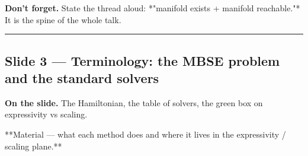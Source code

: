 \documentclass[11pt]{article}
\begin{document}
\textbf{Don't forget.} State the thread aloud: *"manifold exists + manifold
reachable."* It is the spine of the whole talk.

\vspace{4pt}\hrule\vspace{8pt}

\subsection*{Slide 3 --- Terminology: the MBSE problem and the standard solvers}

\textbf{On the slide.} The Hamiltonian, the table of solvers, the green box on
expressivity vs scaling.

**Material --- what each method does and where it lives in the
expressivity / scaling plane.**
\end{document}
